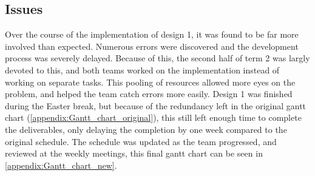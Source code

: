 \subsection{Issues}
Over the course of the implementation of design 1, it was found to be far more involved than expected. Numerous errors were discovered and the development process was severely delayed. Because of this, the second half of term 2 was largly devoted to this, and both teams worked on the implementation instead of working on separate tasks. This pooling of resources allowed more eyes on the problem, and helped the team catch errors more easily. Design 1 was finished during the Easter break, but because of the redundancy left in the original gantt chart (\ref{appendix:Gantt_chart_original}), this still left enough time to complete the deliverables, only delaying the completion by one week compared to the original schedule. The schedule was updated as the team progressed, and reviewed at the weekly meetings, this final gantt chart can be seen in \ref{appendix:Gantt_chart_new}.

